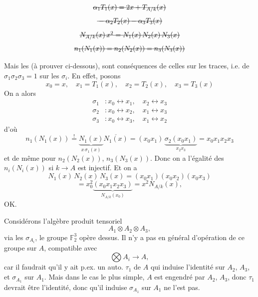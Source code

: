 \documentclass[11pt,a4paper]{article}
\begin{document}
\[
  \text{\struck{$\alpha_1 T_1(x) = 2x + T_{A/k}(x)$}}
\]
\[
  \text{\struck{${} - \alpha_2 T_2(x) - \alpha_3 T_3(x)$}}
\]
\[
  \text{\struck{$N_{A/k}(x)\, x^2 = N_1(x)\, N_2(x)\, N_3(x)$}}
\]
\[
  \text{\struck{$n_1(N_1(x)) = n_2(N_2(x)) = n_3(N_3(x))$}}
\]

Mais  les   (à prouver ci-dessous), sont conséquences de celles sur les traces, i.e. de $\sigma_1 \sigma_2 \sigma_3 = 1$ sur les $\sigma_i$. En effet, posons
\[
  x_0 = x , \quad x_1 = T_1(x) , \quad x_2 = T_2(x) , \quad x_3 = T_3(x)
\]
On a alors
\[
  \begin{aligned}
    \sigma_1 &: x_0 \leftrightarrow x_1 , \quad x_2 \leftrightarrow x_3 \\
    \sigma_2 &: x_0 \leftrightarrow x_2 , \quad x_1 \leftrightarrow x_3 \\
    \sigma_3 &: x_0 \leftrightarrow x_3 , \quad x_1 \leftrightarrow x_2
  \end{aligned}
\]
d'où 
\[
  n_1(N_1(x)) \overset{!}{=} \underbrace{N_1(x)}_{x\, \sigma_1(x)} \overline{N_1(x)}
  = (x_0 x_1)\, \underbrace{\sigma_2(x_0 x_1)}_{x_2 x_3} = x_0 x_1 x_2 x_3
\]
et de même pour $n_2(N_2(x))$, $n_3(N_3(x))$. Donc on a l'égalité des $n_i(N_i(x))$ si $k \to A$ est injectif. Et on a
\[
  N_1(x)\, N_2(x)\, N_3(x) = (x_0 x_1)(x_0 x_2)(x_0 x_3)
\]
\[
  = x_0^2 \underbrace{(x_0 x_1 x_2 x_3)}_{N_{A/k}(x_0)} = x^2 N_{A/k}(x) ,
\]
OK.

Considérons l'algèbre produit tensoriel 
\[
  A_1 \otimes A_2 \otimes A_3 ,
\]
via les $\sigma_{A_i}$, le groupe $\mathbb{F}_2^3$ opère dessus. Il n'y a pas en général d'opération de ce groupe sur $A$, compatible avec
\[
  \textstyle\bigotimes A_i \to A ,
\]
car il faudrait qu'il y ait p.ex. un auto. $\tau_1$ de $A$ qui induise  l'identité sur $A_2$, $A_3$, et $\sigma_{A_1}$ sur $A_1$. Mais dans le cas le plus simple, $A$ est engendré par $A_2$, $A_3$, donc $\tau_1$ devrait être l'identité, donc qu'il induise $\sigma_{A_1}$ sur $A_1$ ne l'est pas.
\end{document}
